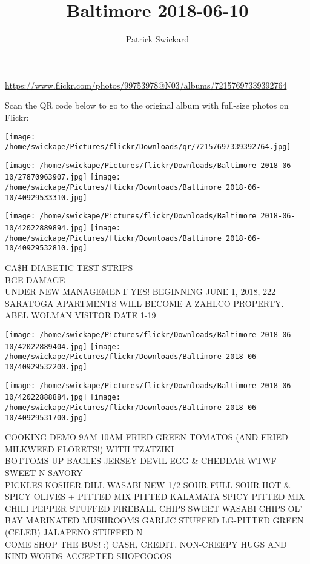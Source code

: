 \documentclass[10pt,letterpaper]{article}
\title{Baltimore 2018-06-10}
\author{Patrick Swickard}
\date{}
\begin{document}
\maketitle

\url{https://www.flickr.com/photos/99753978@N03/albums/72157697339392764}

Scan the QR code below to go to the original album with full-size photos on Flickr:

\texttt{[image: /home/swickape/Pictures/flickr/Downloads/qr/72157697339392764.jpg]}
\pagebreak

\texttt{[image: /home/swickape/Pictures/flickr/Downloads/Baltimore 2018-06-10/27870963907.jpg]}
\texttt{[image: /home/swickape/Pictures/flickr/Downloads/Baltimore 2018-06-10/40929533310.jpg]}

\texttt{[image: /home/swickape/Pictures/flickr/Downloads/Baltimore 2018-06-10/42022889894.jpg]}
\texttt{[image: /home/swickape/Pictures/flickr/Downloads/Baltimore 2018-06-10/40929532810.jpg]}

CA\$H DIABETIC TEST STRIPS\\
BGE DAMAGE\\
UNDER NEW MANAGEMENT YES!  BEGINNING JUNE 1, 2018, 222 SARATOGA APARTMENTS WILL BECOME A ZAHLCO PROPERTY.\\
ABEL WOLMAN VISITOR DATE 1{-}19
\pagebreak

\texttt{[image: /home/swickape/Pictures/flickr/Downloads/Baltimore 2018-06-10/42022889404.jpg]}
\texttt{[image: /home/swickape/Pictures/flickr/Downloads/Baltimore 2018-06-10/40929532200.jpg]}

\texttt{[image: /home/swickape/Pictures/flickr/Downloads/Baltimore 2018-06-10/42022888884.jpg]}
\texttt{[image: /home/swickape/Pictures/flickr/Downloads/Baltimore 2018-06-10/40929531700.jpg]}

COOKING DEMO 9AM{-}10AM FRIED GREEN TOMATOS (AND FRIED MILKWEED FLORETS!) WITH TZATZIKI\\
BOTTOMS UP BAGLES JERSEY DEVIL EGG \& CHEDDAR WTWF SWEET N SAVORY\\
PICKLES KOSHER DILL WASABI NEW 1/2 SOUR FULL SOUR HOT \& SPICY OLIVES + PITTED MIX PITTED KALAMATA SPICY PITTED MIX CHILI PEPPER STUFFED FIREBALL CHIPS SWEET WASABI CHIPS OL' BAY MARINATED MUSHROOMS GARLIC STUFFED LG{-}PITTED GREEN (CELEB) JALAPENO STUFFED N\\
COME SHOP THE BUS!  :) CASH, CREDIT, NON{-}CREEPY HUGS AND KIND WORDS ACCEPTED SHOPGOGOS
\pagebreak
\end{document}
